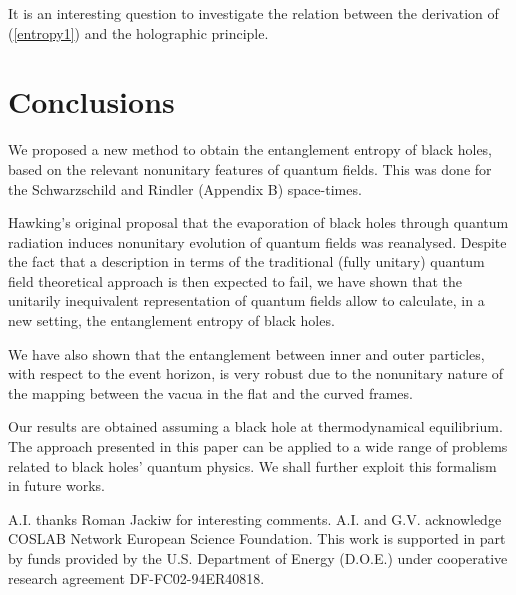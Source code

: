 \noindent It is an interesting question to investigate the relation
between the derivation of (\ref{entropy1}) and the holographic
principle.


\section{Conclusions}

\noindent We proposed a new method to obtain the entanglement
entropy of black holes, based on the relevant nonunitary features of 
quantum fields. This was done for the Schwarzschild and Rindler (Appendix
B) space-times.

\noindent Hawking's original proposal \cite{HAW} that the
evaporation of black holes through quantum radiation induces
nonunitary evolution of quantum fields was reanalysed. Despite the
fact that a description in terms of
the traditional (fully unitary) quantum field theoretical approach 
is then expected to fail, we have shown that
the unitarily inequivalent representation of quantum
fields allow to calculate, in a new setting, the entanglement
entropy of black holes. 

\noindent We have also shown that the entanglement
between inner and outer particles, with respect to the event
horizon, is very robust due to the nonunitary nature of
the mapping between the vacua in the flat and the curved frames.

\noindent Our results are obtained assuming a black hole at
thermodynamical equilibrium. The approach presented in this paper
can be applied to a wide range of problems related to black holes'
quantum physics. We shall further exploit this formalism in future
works.

\acknowledgments

\noindent A.I. thanks Roman Jackiw for interesting comments. A.I. and G.V. 
acknowledge COSLAB Network European Science Foundation. This work is 
supported in part by funds provided by the U.S. Department of Energy 
(D.O.E.) under cooperative research agreement DF-FC02-94ER40818.

\appendixa

